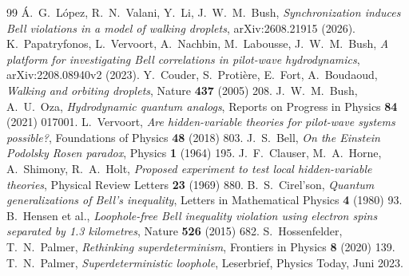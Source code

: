 \begingroup\renewcommand{\chapter}[2]{}\small
\begin{thebibliography}{99}
 Á.~G.~López, R.~N.~Valani, Y.~Li, J.~W.~M.~Bush, \textit{Synchronization induces Bell violations in a model of walking droplets}, arXiv:2608.21915 (2026).
 K.~Papatryfonos, L.~Vervoort, A.~Nachbin, M.~Labousse, J.~W.~M.~Bush, \textit{A platform for investigating Bell correlations in pilot-wave hydrodynamics}, arXiv:2208.08940v2 (2023).
 Y.~Couder, S.~Protière, E.~Fort, A.~Boudaoud, \textit{Walking and orbiting droplets}, Nature \textbf{437} (2005) 208.
 J.~W.~M.~Bush, A.~U.~Oza, \textit{Hydrodynamic quantum analogs}, Reports on Progress in Physics \textbf{84} (2021) 017001.
 L.~Vervoort, \textit{Are hidden-variable theories for pilot-wave systems possible?}, Foundations of Physics \textbf{48} (2018) 803.
 J.~S.~Bell, \textit{On the Einstein Podolsky Rosen paradox}, Physics \textbf{1} (1964) 195.
 J.~F.~Clauser, M.~A.~Horne, A.~Shimony, R.~A.~Holt, \textit{Proposed experiment to test local hidden-variable theories}, Physical Review Letters \textbf{23} (1969) 880.
 B.~S.~Cirel'son, \textit{Quantum generalizations of Bell's inequality}, Letters in Mathematical Physics \textbf{4} (1980) 93.
 B.~Hensen et al., \textit{Loophole-free Bell inequality violation using electron spins separated by 1.3 kilometres}, Nature \textbf{526} (2015) 682.
 S.~Hossenfelder, T.~N.~Palmer, \textit{Rethinking superdeterminism}, Frontiers in Physics \textbf{8} (2020) 139.
 T.~N.~Palmer, \textit{Superdeterministic loophole}, Leserbrief, Physics Today, Juni 2023.
\end{thebibliography}
\endgroup
